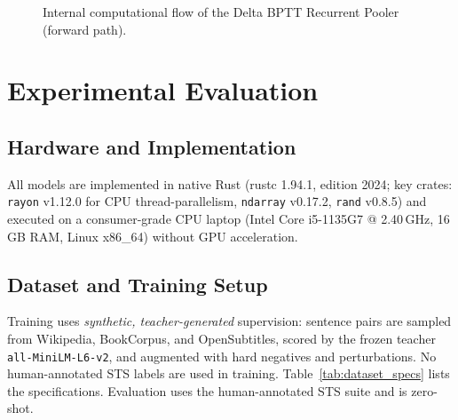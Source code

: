 \documentclass[10pt,journal,compsoc]{IEEEtran}
\begin{document}
\begin{figure}[t!]
\begin{center}
{%
}
\end{center}
\caption{Internal computational flow of the Delta BPTT Recurrent Pooler (forward path).}
\label{fig:pooler_mech}
\end{figure}

\section{Experimental Evaluation}

\subsection{Hardware and Implementation}
All models are implemented in native Rust (rustc 1.94.1, edition 2024; key crates: \texttt{rayon} v1.12.0 for CPU thread-parallelism, \texttt{ndarray} v0.17.2, \texttt{rand} v0.8.5) and executed on a consumer-grade CPU laptop (Intel Core i5-1135G7 @ 2.40\,GHz, 16\,GB RAM, Linux x86\_64) without GPU acceleration.

\subsection{Dataset and Training Setup}
Training uses \emph{synthetic, teacher-generated} supervision: sentence pairs are sampled from Wikipedia, BookCorpus, and OpenSubtitles, scored by the frozen teacher \texttt{all-MiniLM-L6-v2}, and augmented with hard negatives and perturbations. No human-annotated STS labels are used in training. Table~\ref{tab:dataset_specs} lists the specifications. Evaluation uses the human-annotated STS suite and is zero-shot.
\end{document}

